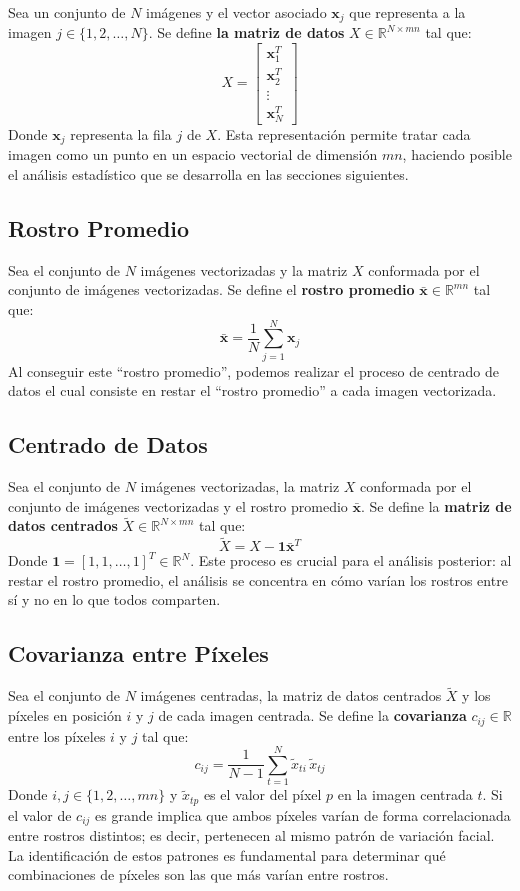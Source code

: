 Sea un conjunto de $N$ imágenes y el vector asociado $\mathbf{x}_j$ que
representa a la imagen $j \in \{1, 2, \dots, N\}$. Se define \textbf{la matriz
de datos} $X \in \mathbb{R}^{N \times mn}$ tal que:
\[
X = \begin{bmatrix}
    \mathbf{x}_1^T \\ \mathbf{x}_2^T \\ \vdots \\ \mathbf{x}_N^T
\end{bmatrix}
\]
Donde $\mathbf{x}_j$ representa la fila $j$ de $X$. Esta representación permite
tratar cada imagen como un punto en un espacio vectorial de dimensión $mn$,
haciendo posible el análisis estadístico que se desarrolla en las secciones
siguientes.


\subsection{Rostro Promedio}

Sea el conjunto de $N$ imágenes vectorizadas y la matriz $X$ conformada
por el conjunto de imágenes vectorizadas. Se define el \textbf{rostro promedio}
$\bar{\mathbf{x}} \in \mathbb{R}^{mn}$ tal que:
\[
\bar{\mathbf{x}} = \frac{1}{N} \sum_{j=1}^{N} \mathbf{x}_j
\]
Al conseguir este ``rostro promedio'', podemos realizar el proceso de centrado de
datos el cual consiste en restar el ``rostro promedio'' a cada imagen vectorizada.


\subsection{Centrado de Datos}

Sea el conjunto de $N$ imágenes vectorizadas, la matriz $X$ conformada
por el conjunto de imágenes vectorizadas y el rostro promedio $\bar{\mathbf{x}}$.
Se define la \textbf{matriz de datos centrados} $\tilde{X} \in
\mathbb{R}^{N \times mn}$ tal que:
\[
\tilde{X} = X - \mathbf{1}\bar{\mathbf{x}}^T
\]
Donde $\mathbf{1} = [1, 1, \dots, 1]^T \in \mathbb{R}^N$. Este proceso es crucial
para el análisis posterior: al restar el rostro promedio, el análisis se concentra
en cómo varían los rostros entre sí y no en lo que todos comparten.


\subsection{Covarianza entre Píxeles}

Sea el conjunto de $N$ imágenes centradas, la matriz de datos centrados $\tilde{X}$
y los píxeles en posición $i$ y $j$ de cada imagen centrada. Se define la
\textbf{covarianza} $c_{ij} \in \mathbb{R}$ entre los píxeles $i$ y $j$ tal que:
\[
c_{ij} = \frac{1}{N-1}\sum_{t=1}^{N} \tilde{x}_{ti}\,\tilde{x}_{tj}
\]
Donde $i, j \in \{1, 2, \dots, mn\}$ y $\tilde{x}_{tp}$ es el valor del píxel $p$
en la imagen centrada $t$. Si el valor de $c_{ij}$ es grande implica que ambos píxeles
varían de forma correlacionada entre rostros distintos; es decir, pertenecen al mismo
patrón de variación facial. La identificación de estos patrones es fundamental para
determinar qué combinaciones de píxeles son las que más varían entre rostros.


